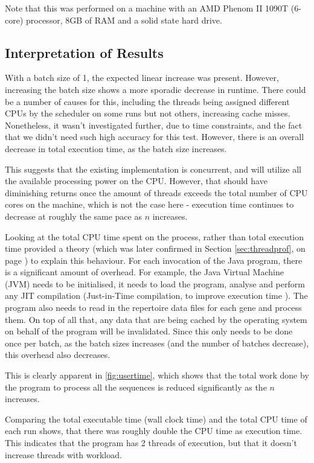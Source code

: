 Note that this was performed on a machine with an AMD Phenom II 1090T (6-core) processor, 8GB of RAM and a solid state hard drive.

\subsection{Interpretation of Results}
\label{sec:threadbench}
With a batch size of 1, the expected linear increase was present. However, increasing the batch size shows a more sporadic decrease in runtime. There could be a number of causes for this, including the threads being assigned different CPUs by the scheduler on some runs but not others, increasing cache misses. Nonetheless, it wasn't investigated further, due to time constraints, and the fact that we didn't need such high accuracy for this test. However, there is an overall decrease in total execution time, as the batch size increases.

This suggests that the existing implementation is concurrent, and will utilize all the available processing power on the CPU. However, that should have diminishing returns once the amount of threads exceeds the total number of CPU cores on the machine, which is not the case here - execution time continues to decrease at roughly the same pace as $n$ increases.

Looking at the total CPU time spent on the process, rather than total execution time provided a theory (which was later confirmed in Section \ref{sec:threadprof}, on page \pageref{sec:threadprof}) to explain this behaviour.
For each invocation of the Java program, there is a significant amount of overhead. For example, the Java Virtual Machine (JVM) needs to be initialised, it needs to load the program, analyse and perform any JIT compilation (Just-in-Time compilation, to improve execution time \autocite{jit}). The program also needs to read in the repertoire data files for each gene and process them. On top of all that, any data that are being cached by the operating system on behalf of the program will be invalidated. Since this only needs to be done once per batch, as the batch sizes increases (and the number of batches decrease), this overhead also decreases.

This is clearly apparent in \autoref{fig:usertime}, which shows that the total work done by the program to process all the sequences is reduced significantly as the $n$ increases.

Comparing the total executable time (wall clock time) and the total CPU time of each run shows, that there was roughly double the CPU time as execution time. This indicates that the program has 2 threads of execution, but that it doesn't increase threads with workload.


